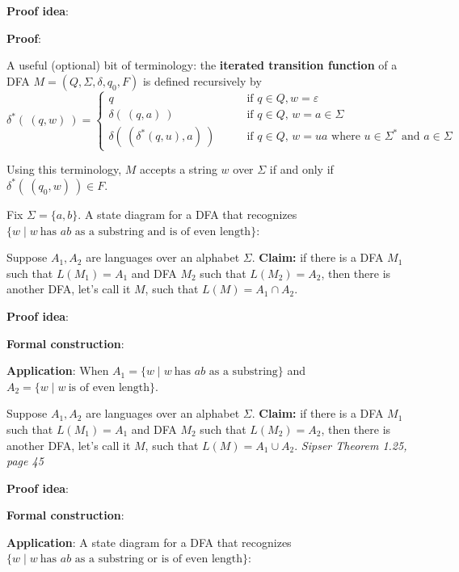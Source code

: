 \documentclass[12pt, oneside]{article}
\begin{document}
{\bf Proof idea}:


{\bf Proof}: 




\vfill
A useful (optional) bit of terminology: the {\bf iterated transition function} of a DFA
$M = (Q, \Sigma, \delta, q_0, F)$ is defined recursively by
\[
\delta^* (~(q,w)~) 
=\begin{cases}
q  \qquad &\text{if $q \in Q, w = \varepsilon$} \\
\delta( ~(q,a)~) \qquad &\text{if $q \in Q$, $w = a \in \Sigma$ } \\
\delta(~(\delta^*(q,u), a) ~) \qquad &\text{if $q \in Q$, $w = ua$ where $u \in  \Sigma^*$ and $a \in \Sigma$}
\end{cases}
\]

Using  this terminology, $M$ accepts a string $w$ over $\Sigma$ if and only if $\delta^*( ~(q_0,w)~) \in F$.

\newpage

Fix  $\Sigma = \{a,b\}$. A state diagram for a DFA that recognizes 
$\{w \mid w~\text{has $ab$ as a substring and is of even length} \}$:


\vspace{120pt}


Suppose $A_1, A_2$ are languages over an alphabet $\Sigma$.
{\bf Claim:} if there is a DFA $M_1$ such that $L(M_1) = A_1$ and 
DFA $M_2$ such that $L(M_2) = A_2$, then there is another DFA, let's call it $M$, such that 
$L(M) = A_1 \cap A_2$.

{\bf Proof idea}:


{\bf Formal construction}: 


\vspace{70pt}

{\bf Application}:  When $A_1 = \{w \mid w~\text{has $ab$ as a substring} \}$ and 
$A_2 = \{ w \mid w~\text{is of even length} \}$.


\newpage

Suppose $A_1, A_2$ are languages over an alphabet $\Sigma$.
{\bf Claim:} if there is a DFA $M_1$ such that $L(M_1) = A_1$ and 
DFA $M_2$ such that $L(M_2) = A_2$, then there is another DFA, let's call it $M$, such that 
$L(M) = A_1 \cup A_2$.  {\it Sipser Theorem 1.25, page 45}

{\bf Proof idea}:


{\bf Formal construction}: 

\vspace{70pt}

{\bf Application}: A state diagram for a DFA that recognizes $\{w \mid w~\text{has $ab$ as a substring or is of even length} \}$:
\end{document}
